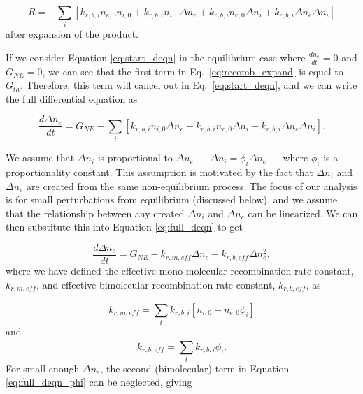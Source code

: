 \begin{equation}
  \label{eq:recomb_expand}
  R = - \sum_{i}^{}[k_{r, b, i}n_{e,0}n_{i,0}  + k_{r, b, i}n_{i,0}\Delta n_{e} + k_{r, b, i}n_{e,0}\Delta n_{i} + k_{r, b, i}\Delta n_{e}\Delta n_{i}]
\end{equation}
after expansion of the product.

If we consider Equation \ref{eq:start_deqn} in the equilibrium case where $\frac{dn_{e}}{dt} = 0$ and $G_{NE} = 0$, we can see that the first term in Eq.\ \ref{eq:recomb_expand} is equal to $G_{th}$. Therefore, this term will cancel out in Eq.\ \ref{eq:start_deqn}, and we can write the full differential equation as

\begin{equation}
  \label{eq:full_deqn}
\frac{d\Delta n_{e}}{dt} = G_{NE}  -  \sum_{i}^{}[k_{r, b, i}n_{i,0}\Delta n_{e} + k_{r, b, i}n_{e,0}\Delta n_{i} + k_{r, b, i}\Delta n_{e}\Delta n_{i}].
\end{equation}

We assume that $\Delta n_i$ is proportional to $\Delta n_e$ — $\Delta n_i = \phi_i \Delta n_{e}$ — where $\phi_i$ is a proportionality constant. This assumption is motivated by the fact that $\Delta n_i$ and $\Delta n_e$ are created from the same non-equilibrium process. The focus of our analysis is for small perturbations from equilibrium (discussed below), and we assume that the relationship between any created $\Delta n_i$ and $\Delta n_e$ can be linearized. We can then substitute this into Equation \ref{eq:full_deqn} to get

\begin{equation}
  \label{eq:full_deqn_phi}
\frac{d\Delta n_{e}}{dt} = G_{NE} - k_{r, m, eff}\Delta n_{e} - k_{r, b, eff} \Delta n_{e}^2,
\end{equation}
where we have defined the effective mono-molecular recombination rate constant, $k_{r, m, eff}$, and effective bimolecular recombination rate constant, $k_{r, b, eff}$, as


\begin{equation}
\label{eq:krm_eff_def}
k_{r, m, eff} = \sum_{i}^{}k_{r, b, i}[n_{i,0} + n_{e,0}\phi_i]
\end{equation}
and
\begin{equation}
\label{eq:krb_eff_def}
k_{r, b, eff} = \sum_{i}^{}k_{r, b, i}\phi_i.
\end{equation}
For small enough $\Delta n_e$, the second (bimolecular) term in Equation \ref{eq:full_deqn_phi} can be neglected, giving

